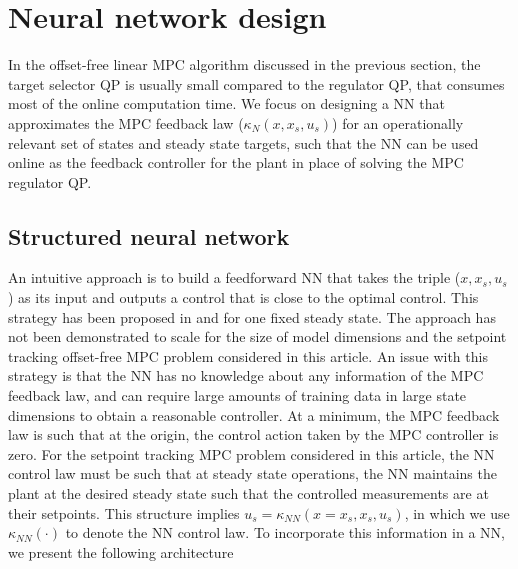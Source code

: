\documentclass[preprint,5p, twocolumn, authoryear]{elsarticle}
\begin{document}
\section{Neural network design} \label{sec:controller_design}

In the offset-free linear MPC algorithm discussed in the previous 
section, the target selector QP is
usually small compared to the 
regulator QP, that consumes most of the online computation time. We
focus on designing a NN that approximates the 
MPC feedback law ($\kappa_N(x, x_s, u_s)$)
for an operationally relevant set of states and steady state targets, 
such that the NN 
can be used online as the feedback controller 
for the plant in place of solving the MPC regulator QP.

\subsection{Structured neural network}
An intuitive approach is to build a feedforward NN 
that takes the triple ($x, x_s, u_s$) as its input 
and outputs a control that is close to the optimal control. 
This strategy has been proposed in \cite*{karg:lucia:2020} and 
\cite*{chen:saulnier:atanasov:lee:kumar:pappas:morari:2018}
for one fixed steady state. The approach has not been 
demonstrated to scale for the size of model dimensions 
and the setpoint tracking 
offset-free MPC problem considered in this article.
An issue with this strategy 
is that the NN has no knowledge about any information 
of the MPC feedback law, and can require large amounts
of training data in large state dimensions 
to obtain a reasonable controller. At a minimum,
the MPC feedback law is such that at the origin, the 
control action taken by the MPC controller is zero. For the 
setpoint tracking MPC problem considered in this article, 
the NN control law must be such that at steady state 
operations, the NN maintains the plant at the desired steady state
such that the controlled measurements are at their setpoints.
This structure implies $u_s = \kappa_{NN}(x = x_s, x_s, u_s)$, 
in which we use $\kappa_{NN}(\cdot)$ to denote the NN control law.
To incorporate this information in a NN, we present the following
architecture
\end{document}
